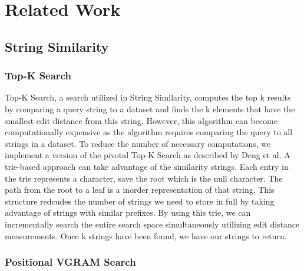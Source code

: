\documentclass[pdftex,12pt,letter]{article}
\begin{document}
\section{Related Work}

\subsection{String Similarity}

\subsubsection{Top-K Search}
Top-K Search, a search utilized in String Similarity, computes the top k results by comparing a query string to a dataset and finds the k elements that have the smallest edit distance from this string. However, this algorithm can become computationally expensive as the algorithm requires comparing the query to all strings in a dataset. To reduce the number of necessary computations, we implement a version of the pivotal Top-K Search as described by Deng et al. A trie-based approach can take advantage of the similarity strings. Each entry in the trie represents a character, save the root which is the null character. The path from the root to a leaf is a inorder representation of that string. This structure redcudes the number of strings we need to store in full by taking advantage of strings with similar prefixes. By using this trie, we can incrementally search the entire search space simultaneously utilizing edit distance measurements. Once k strings have been found, we have our strings to return. 

\subsubsection{Positional VGRAM Search}
\end{document}
